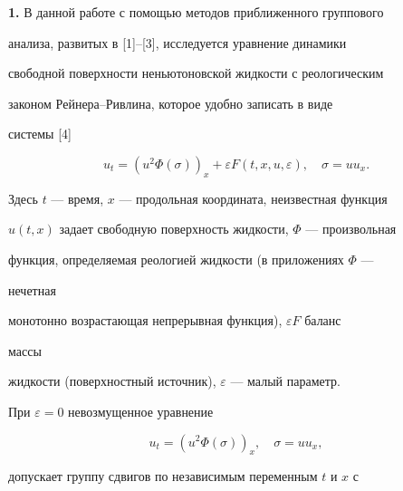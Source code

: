  




\maketitle 


\label{begin} 


 


 


{\bf 1.} В данной работе с помощью методов приближенного группового 


анализа, развитых в [1]--[3], исследуется уравнение динамики 


свободной поверхности неньютоновской жидкости с реологическим 


законом Рейнера--Ривлина, которое удобно записать в виде 


системы [4] 


\begin{equation} 


u_t=(u^2\Phi(\sigma))_x+\varepsilon F 


(t,x,u,\varepsilon),\quad \sigma=u u_x.\tag{1.1} 


\end{equation} 


Здесь $t$ --- время, $x$ --- продольная координата, неизвестная функция 


$u(t,x)$ задает свободную поверхность жидкости, $\Phi$ --- произвольная 


функция, определяемая реологией жидкости (в приложениях $\Phi$ --- 


нечетная 


монотонно возрастающая непрерывная функция), $\varepsilon F$ баланс 


массы 


жидкости (поверхностный источник), $\varepsilon$ --- малый параметр. 


 


При $\varepsilon=0$ невозмущенное уравнение 


\begin{equation} 


u_t=(u^2\Phi(\sigma))_x,\quad \sigma=u u_x,\tag{1.2} 


\end{equation} 


допускает группу сдвигов по независимым переменным $t$ и $x$ с 


